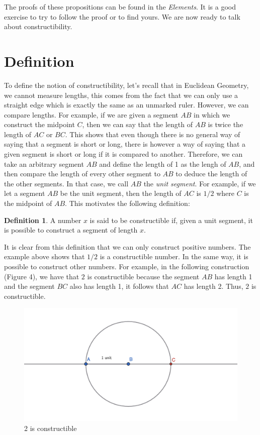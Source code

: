 \documentclass{article}
\theoremstyle{plain}
\theoremstyle{definition}
\newtheorem*{definition}{Definition}
\begin{document}
The proofs of these propositions can be found in the \textit{Elements}. It is a good exercise to try to follow the proof or to find yours. We are now ready to talk about constructibility.

\section*{Definition}

To define the notion of constructibility, let's recall that in Euclidean Geometry, we cannot measure lengths, this comes from the fact that we can only use a straight edge which is exactly the same as an unmarked ruler. However, we can compare lengths. For example, if we are given a segment $AB$ in which we construct the midpoint $C$, then we can say that the length of $AB$ is twice the length of $AC$ or $BC$. This shows that even though there is no general way of saying that a segment is short or long, there is however a way of saying that a given segment is short or long if it is compared to another. Therefore, we can take an arbitrary segment $AB$ and define the length of 1 as the lengh of $AB$, and then compare the length of every other segment to $AB$ to deduce the length of the other segments. In that case, we call $AB$ the \textit{unit segment}. For example, if we let a segment $AB$ be the unit segment, then the length of $AC$ is $1/2$ where $C$ is the midpoint of $AB$. This motivates the following definition:

\begin{definition}
    A number $x$ is said to be constructible if, given a unit segment, it is possible to construct a segment of length $x$.
\end{definition}

\noindent It is clear from this definition that we can only construct positive numbers. The example above shows that $1/2$ is a constructible number. In the same way, it is possible to construct other numbers. For example, in the following construction (Figure 4), we have that $2$ is constructible because the segment $AB$ has length 1 and the segment $BC$ also has length 1, it follows that $AC$ has length 2. Thus, $2$ is constructible.

\begin{figure}[h!]
    \centering
    \includegraphics[scale=0.35]{pics/2construct.png}
    \caption{2 is constructible}
\end{figure}
\end{document}
